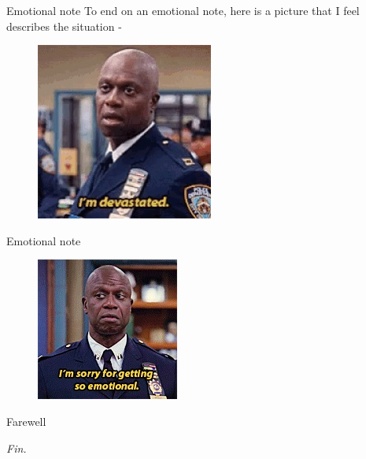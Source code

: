 \documentclass[handout, aspectratio=169]{beamer}
\begin{document}
\begin{frame}{Emotional note} 
	To end on an emotional note, here is a picture that I feel describes the situation -\\
	\begin{figure}[!htb]
		\centering
		\includegraphics[width=4 cm]{emotion.jpg}		
	\end{figure}
	\vspace{2 cm}
\end{frame}
\begin{frame}{Emotional note} 
	\begin{figure}[!htb]
		\centering
		\includegraphics[width=3 cm]{emotion-2.jpg}		
	\end{figure}
\end{frame}
\begin{frame}{Farewell}
	\begin{center}
		\begin{Huge}
			\emph{Fin.}
		\end{Huge}
	\end{center}
\end{frame}
\end{document}

